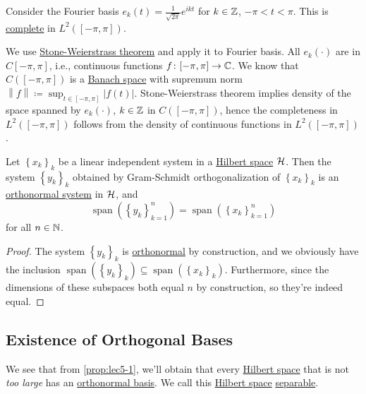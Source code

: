 \begin{eg}
	Consider the Fourier basis \(e_k (t) = \frac{1}{\sqrt{2\pi }} e^{ikt}\) for \(k\in \mathbb{\MakeUppercase{z}} \), \(-\pi < t < \pi \). This is \hyperref[def:complete-system]{complete} in \(L^2([-\pi , \pi ])\).
\end{eg}
\begin{explanation}
	We use \href{https://en.wikipedia.org/wiki/Stone%E2%80%93Weierstrass_theorem}{Stone-Weierstrass theorem} and apply it to Fourier basis. All \(e_k(\cdot)\) are in \(C[-\pi , \pi ]\), i.e., continuous functions \(f\colon [-\pi , \pi ]\to \mathbb{\MakeUppercase{c}} \). We know that \(C([-\pi , \pi ])\) is a \hyperref[def:Banach-space]{Banach space} with supremum norm \(\left\lVert f\right\rVert \coloneqq \sup _{t\in [-\pi, \pi ]}\left\vert f(t) \right\vert\). Stone-Weierstrass theorem implies density of the space spanned by \(e_k(\cdot)\), \(k\in \mathbb{\MakeUppercase{z}} \) in \(C([-\pi , \pi ])\), hence the completeness in \(L^2([-\pi , \pi ])\) follows from the density of continuous functions in \(L^2([-\pi , \pi ])\). 
\end{explanation}

\begin{proposition}\label{prop:lec5-1}
	Let \(\left\{ x_k \right\} _k\) be a linear independent system in a \hyperref[def:Hilbert-space]{Hilbert space} \(\mathcal{\MakeUppercase{h}} \). Then the system \(\left\{ y_k \right\} _k\) obtained by Gram-Schmidt orthogonalization of \(\left\{ x_k \right\} _k\) is an \hyperref[def:orthonormal-system]{orthonormal system} in \(\mathcal{\MakeUppercase{h}} \), and
	\[
		\mathop{\mathrm{span}}(\left\{ y_k \right\} _{k=1}^n) = \mathop{\mathrm{span}}(\left\{ x_k \right\} _{k=1}^n)
	\]
	for all \(n\in \mathbb{\MakeUppercase{n}} \).
\end{proposition}
\begin{proof}
	The system \(\left\{ y_k \right\} _k\) is \hyperref[def:orthonormal-system]{orthonormal} by construction, and we obviously have the inclusion \(\mathop{\mathrm{span}}(\left\{ y_k \right\} _k) \subseteq \mathop{\mathrm{span}}(\left\{ x_k \right\} _k)\). Furthermore, since the dimensions of these subspaces both equal \(n\) by construction, so they're indeed equal.
\end{proof}

\subsection{Existence of Orthogonal Bases}
We see that from \autoref{prop:lec5-1}, we'll obtain that every \hyperref[def:Hilbert-space]{Hilbert space} that is not \emph{too large} has an \hyperref[def:orthonormal-basis]{orthonormal basis}. We call this \hyperref[def:Hilbert-space]{Hilbert space} \hyperref[def:separable]{separable}.

